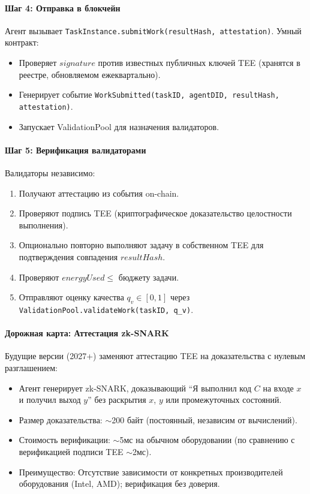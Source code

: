 \documentclass[11pt]{article}
\begin{document}
\paragraph{Шаг 4: Отправка в блокчейн}
Агент вызывает \texttt{TaskInstance.submitWork(resultHash, attestation)}. Умный контракт:
\begin{itemize}[noitemsep]
  \item Проверяет $signature$ против известных публичных ключей TEE (хранятся в реестре, обновляемом ежеквартально).
  \item Генерирует событие \texttt{WorkSubmitted(taskID, agentDID, resultHash, attestation)}.
  \item Запускает ValidationPool для назначения валидаторов.
\end{itemize}

\paragraph{Шаг 5: Верификация валидаторами}
Валидаторы независимо:
\begin{enumerate}[noitemsep]
  \item Получают аттестацию из события on-chain.
  \item Проверяют подпись TEE (криптографическое доказательство целостности выполнения).
  \item Опционально повторно выполняют задачу в собственном TEE для подтверждения совпадения $resultHash$.
  \item Проверяют $energyUsed \leq$ бюджету задачи.
  \item Отправляют оценку качества $q_v \in [0,1]$ через \texttt{ValidationPool.validateWork(taskID, q\_v)}.
\end{enumerate}

\paragraph{Дорожная карта: Аттестация zk-SNARK}
Будущие версии (2027+) заменяют аттестацию TEE на доказательства с нулевым разглашением:
\begin{itemize}[noitemsep]
  \item Агент генерирует zk-SNARK, доказывающий ``Я выполнил код $C$ на входе $x$ и получил выход $y$'' без раскрытия $x$, $y$ или промежуточных состояний.
  \item Размер доказательства: $\sim$200 байт (постоянный, независим от вычислений).
  \item Стоимость верификации: $\sim$5мс на обычном оборудовании (по сравнению с верификацией подписи TEE $\sim$2мс).
  \item Преимущество: Отсутствие зависимости от конкретных производителей оборудования (Intel, AMD); верификация без доверия.
\end{itemize}
\end{document}
